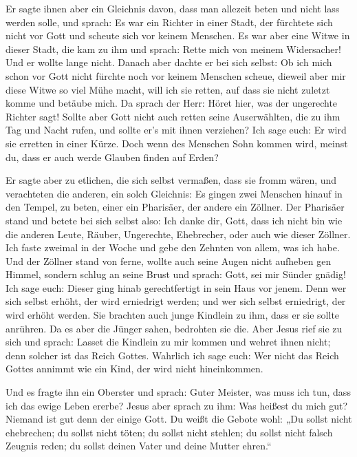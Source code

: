  Er sagte ihnen aber ein Gleichnis davon, dass man
allezeit beten und nicht lass werden solle,  und sprach:
Es war ein Richter in einer Stadt, der fürchtete sich nicht vor Gott und
scheute sich vor keinem Menschen.  Es war aber eine Witwe
in dieser Stadt, die kam zu ihm und sprach: Rette mich von meinem
Widersacher!  Und er wollte lange nicht. Danach aber
dachte er bei sich selbst: Ob ich mich schon vor Gott nicht fürchte noch
vor keinem Menschen scheue,  dieweil aber mir diese Witwe
so viel Mühe macht, will ich sie retten, auf dass sie nicht zuletzt
komme und betäube mich.  Da sprach der Herr: Höret hier,
was der ungerechte Richter sagt!  Sollte aber Gott nicht
auch retten seine Auserwählten, die zu ihm Tag und Nacht rufen, und
sollte er's mit ihnen verziehen?  Ich sage euch: Er wird
sie erretten in einer Kürze. Doch wenn des Menschen Sohn kommen wird,
meinst du, dass er auch werde Glauben finden auf Erden?

 Er sagte aber zu etlichen, die sich selbst vermaßen, dass
sie fromm wären, und verachteten die anderen, ein solch Gleichnis:
 Es gingen zwei Menschen hinauf in den Tempel, zu beten,
einer ein Pharisäer, der andere ein Zöllner.  Der
Pharisäer stand und betete bei sich selbst also: Ich danke dir, Gott,
dass ich nicht bin wie die anderen Leute, Räuber, Ungerechte,
Ehebrecher, oder auch wie dieser Zöllner.  Ich faste
zweimal in der Woche und gebe den Zehnten von allem, was ich habe.
 Und der Zöllner stand von ferne, wollte auch seine Augen
nicht aufheben gen Himmel, sondern schlug an seine Brust und sprach:
Gott, sei mir Sünder gnädig!  Ich sage euch: Dieser ging
hinab gerechtfertigt in sein Haus vor jenem. Denn wer sich selbst
erhöht, der wird erniedrigt werden; und wer sich selbst erniedrigt, der
wird erhöht werden.  Sie brachten auch junge Kindlein zu
ihm, dass er sie sollte anrühren. Da es aber die Jünger sahen, bedrohten
sie die.  Aber Jesus rief sie zu sich und sprach: Lasset
die Kindlein zu mir kommen und wehret ihnen nicht; denn solcher ist das
Reich Gottes.  Wahrlich ich sage euch: Wer nicht das
Reich Gottes annimmt wie ein Kind, der wird nicht hineinkommen.

 Und es fragte ihn ein Oberster und sprach: Guter
Meister, was muss ich tun, dass ich das ewige Leben ererbe?
 Jesus aber sprach zu ihm: Was heißest du mich gut?
Niemand ist gut denn der einige Gott.  Du weißt die
Gebote wohl: „Du sollst nicht ehebrechen; du sollst nicht töten; du
sollst nicht stehlen; du sollst nicht falsch Zeugnis reden; du sollst
deinen Vater und deine Mutter ehren.``

